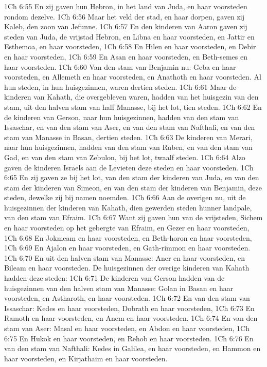 1Ch 6:55  En zij gaven hun Hebron, in het land van Juda, en haar voorsteden rondom dezelve.
1Ch 6:56  Maar het veld der stad, en haar dorpen, gaven zij Kaleb, den zoon van Jefunne.
1Ch 6:57  En den kinderen van Aaron gaven zij steden van Juda, de vrijstad Hebron, en Libna en haar voorsteden, en Jattir en Esthemoa, en haar voorsteden,
1Ch 6:58  En Hilen en haar voorsteden, en Debir en haar voorsteden,
1Ch 6:59  En Asan en haar voorsteden, en Beth-semes en haar voorsteden.
1Ch 6:60  Van den stam van Benjamin nu: Geba en haar voorsteden, en Allemeth en haar voorsteden, en Anathoth en haar voorsteden. Al hun steden, in hun huisgezinnen, waren dertien steden.
1Ch 6:61  Maar de kinderen van Kahath, die overgebleven waren, hadden van het huisgezin van den stam, uit den halven stam van half Manasse, bij het lot, tien steden.
1Ch 6:62  En de kinderen van Gerson, naar hun huisgezinnen, hadden van den stam van Issaschar, en van den stam van Aser, en van den stam van Nafthali, en van den stam van Manasse in Basan, dertien steden.
1Ch 6:63  De kinderen van Merari, naar hun huisgezinnen, hadden van den stam van Ruben, en van den stam van Gad, en van den stam van Zebulon, bij het lot, twaalf steden.
1Ch 6:64  Alzo gaven de kinderen Israels aan de Levieten deze steden en haar voorsteden.
1Ch 6:65  En zij gaven ze bij het lot, van den stam der kinderen van Juda, en van den stam der kinderen van Simeon, en van den stam der kinderen van Benjamin, deze steden, dewelke zij bij namen noemden.
1Ch 6:66  Aan de overigen nu, uit de huisgezinnen der kinderen van Kahath, dien gewerden steden hunner landpale, van den stam van Efraim.
1Ch 6:67  Want zij gaven hun van de vrijsteden, Sichem en haar voorsteden op het gebergte van Efraim, en Gezer en haar voorsteden,
1Ch 6:68  En Jokmeam en haar voorsteden, en Beth-horon en haar voorsteden,
1Ch 6:69  En Ajalon en haar voorsteden, en Gath-rimmon en haar voorsteden.
1Ch 6:70  En uit den halven stam van Manasse: Aner en haar voorsteden, en Bileam en haar voorsteden. De huisgezinnen der overige kinderen van Kahath hadden deze steden:
1Ch 6:71  De kinderen van Gerson hadden van de huisgezinnen van den halven stam van Manasse: Golan in Basan en haar voorsteden, en Astharoth, en haar voorsteden.
1Ch 6:72  En van den stam van Issaschar: Kedes en haar voorsteden, Dobrath en haar voorsteden,
1Ch 6:73  En Ramoth en haar voorsteden, en Anem en haar voorsteden.
1Ch 6:74  En van den stam van Aser: Masal en haar voorsteden, en Abdon en haar voorsteden,
1Ch 6:75  En Hukok en haar voorsteden, en Rehob en haar voorsteden.
1Ch 6:76  En van den stam van Nafthali: Kedes in Galilea, en haar voorsteden, en Hammon en haar voorsteden, en Kirjathaim en haar voorsteden.
